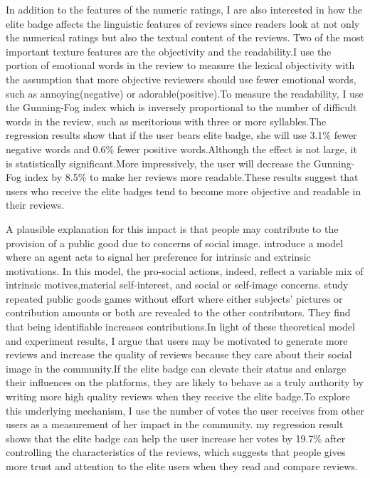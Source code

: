 \documentclass[12pt]{article}%
\begin{document}
In addition to the features of the numeric ratings, I are also interested in how the elite badge affects the linguistic features of reviews since readers  look  at not only the numerical ratings but also the textual content of the reviews. Two of the most important texture features are the objectivity and the readability.I use the portion of emotional words in the review to measure the lexical objectivity with the assumption that more objective reviewers should use fewer emotional words, such as annoying(negative) or adorable(positive).To measure the readability, I use the Gunning-Fog index which is inversely proportional to the number of difficult words in the review, such as meritorious with three or more syllables.The regression results show that if the user bears elite badge, she will use 3.1\% fewer negative words and 0.6\% fewer positive words.Although the effect is not large, it is statistically significant.More impressively, the user will decrease the Gunning-Fog index by 8.5\% to make her reviews more readable.These results suggest that users who receive the elite badges tend to become more objective and readable in their reviews.

A plausible explanation for this impact is that people may contribute to the provision of a public good due to concerns of social image.\cite{benabou2006incentives} introduce a model where an agent acts to signal her preference for intrinsic and extrinsic motivations. In this model, the pro-social actions, indeed, reflect a variable mix of intrinsic motives,material self-interest, and social or self-image concerns.\cite{andreoni2004public} study repeated public goods games without effort where either subjects' pictures or contribution amounts or both are revealed to the other contributors. They find that being identifiable increases contributions.In light of these theoretical model and experiment results, I argue that users may be motivated to generate more reviews and increase the quality of reviews because they care about their social image in the community.If the elite badge can elevate their status and enlarge their influences on the platforms, they are likely to behave as a truly authority by writing more high quality reviews when they receive the elite badge.To explore this underlying mechanism, I use the number of votes the user receives from other users as a measurement of her impact in the community. my regression result shows that the elite badge can help the user increase her votes by 19.7\% after controlling the characteristics of the reviews, which suggests that people gives more trust and attention to the elite users when they read and compare reviews. 
\end{document}
